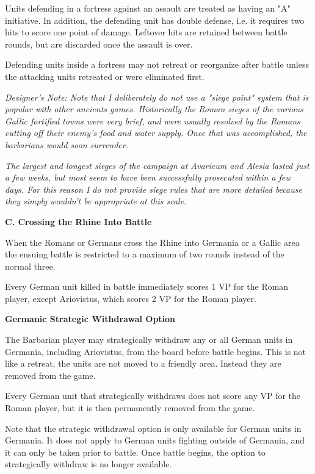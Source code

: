 Units defending in a fortress against an assault are treated as having an "A" initiative. In addition, the defending unit has double defense, i.e. it requires two hits to score one point of damage. Leftover hits are retained between battle rounds, but are discarded once the assault is over.

Defending units inside a fortress may not retreat or reorganize after battle unless the attacking units retreated or were eliminated first.

\textit{Designer's Note: Note that I deliberately do not use a "siege point" system that is popular with other ancients games. Historically the Roman sieges of the various Gallic fortified towns were very brief, and were usually resolved by the Romans cutting off their enemy's food and water supply. Once that was accomplished, the barbarians would soon surrender.}

\textit{The largest and longest sieges of the campaign at Avaricum and Alesia lasted just a few weeks, but most seem to have been successfully prosecuted within a few days. For this reason I do not provide siege rules that are more detailed because they simply wouldn't be appropriate at this scale.}

\textbf{C. Crossing the Rhine Into Battle}
\par
When the Romans or Germans cross the Rhine into Germania or a Gallic area the ensuing battle is restricted to a maximum of two rounds instead of the normal three.

Every German unit killed in battle immediately scores 1 VP for the Roman player, except Ariovistus, which scores 2 VP for the Roman player.

\textbf{Germanic Strategic Withdrawal Option}
\par
The Barbarian player may strategically withdraw any or all German units in Germania, including Ariovistus, from the board before battle begins. This is not like a retreat, the units are not moved to a friendly area. Instead they are removed from the game.

Every German unit that strategically withdraws does not score any VP for the Roman player, but it is then permanently removed from the game.

Note that the strategic withdrawal option is only available for German units in Germania. It does not apply to German units fighting outside of Germania, and it can only be taken prior to battle. Once battle begins, the option to strategically withdraw is no longer available.

